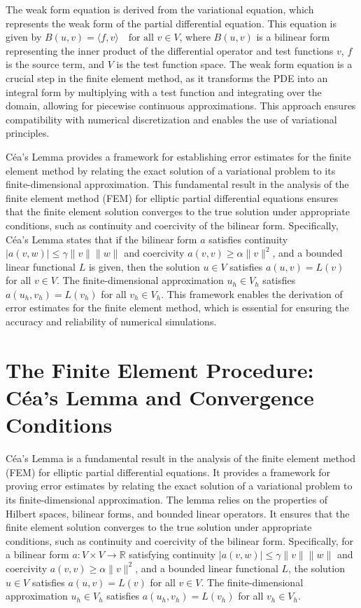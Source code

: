 \documentclass[12pt, a4paper]{article}
\begin{document}
The weak form equation is derived from the variational equation, which represents the weak form of the partial differential equation. This equation is given by \(B(u, v) = \langle f, v \rangle \quad \text{for all } v \in V\), where \(B(u, v)\) is a bilinear form representing the inner product of the differential operator and test functions \(v\), \(f\) is the source term, and \(V\) is the test function space. The weak form equation is a crucial step in the finite element method, as it transforms the PDE into an integral form by multiplying with a test function and integrating over the domain, allowing for piecewise continuous approximations. This approach ensures compatibility with numerical discretization and enables the use of variational principles.

Céa's Lemma provides a framework for establishing error estimates for the finite element method by relating the exact solution of a variational problem to its finite-dimensional approximation. This fundamental result in the analysis of the finite element method (FEM) for elliptic partial differential equations ensures that the finite element solution converges to the true solution under appropriate conditions, such as continuity and coercivity of the bilinear form. Specifically, Céa's Lemma states that if the bilinear form \(a\) satisfies continuity \(|a(v, w)| \leq \gamma \|v\| \|w\|\) and coercivity \(a(v, v) \geq \alpha \|v\|^2\), and a bounded linear functional \(L\) is given, then the solution \(u \in V\) satisfies \(a(u, v) = L(v)\) for all \(v \in V\). The finite-dimensional approximation \(u_h \in V_h\) satisfies \(a(u_h, v_h) = L(v_h)\) for all \(v_h \in V_h\). This framework enables the derivation of error estimates for the finite element method, which is essential for ensuring the accuracy and reliability of numerical simulations.

\section{The Finite Element Procedure: Céa's Lemma and Convergence Conditions}
\label{sec:d54cf0e1-7368-4c85-b7d9-4002ce3d80ae}

Céa's Lemma is a fundamental result in the analysis of the finite element method (FEM) for elliptic partial differential equations. It provides a framework for proving error estimates by relating the exact solution of a variational problem to its finite-dimensional approximation. The lemma relies on the properties of Hilbert spaces, bilinear forms, and bounded linear operators. It ensures that the finite element solution converges to the true solution under appropriate conditions, such as continuity and coercivity of the bilinear form. Specifically, for a bilinear form \(a: V \times V \rightarrow \mathbb{R}\) satisfying continuity \(|a(v, w)| \leq \gamma \|v\| \|w\|\) and coercivity \(a(v, v) \geq \alpha \|v\|^2\), and a bounded linear functional \(L\), the solution \(u \in V\) satisfies \(a(u, v) = L(v)\) for all \(v \in V\). The finite-dimensional approximation \(u_h \in V_h\) satisfies \(a(u_h, v_h) = L(v_h)\) for all \(v_h \in V_h\).
\end{document}

